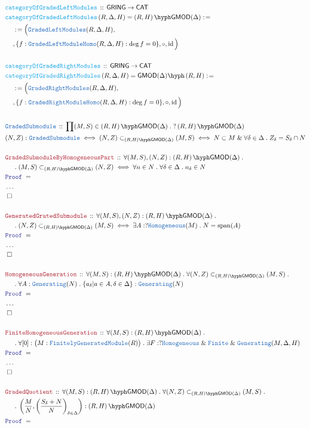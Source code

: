 \documentclass[12pt]{scrartcl}
\newcommand{\TYPE}[1]{\textcolor{NavyBlue}{\mathtt{#1}}}
\newcommand{\FUNC}[1]{\textcolor{Cerulean}{\mathtt{#1}}}
\newcommand{\LOGIC}[1]{\textcolor{Blue}{\mathtt{#1}}}
\newcommand{\THM}[1]{\textcolor{Maroon}{\mathtt{#1}}}
\renewcommand{\.}{\; . \;}
\newcommand{\de}{: \kern 0.1pc =}
\newcommand{\Act}[1]{\left(#1\right)}
\newcommand{\Theorem}[2]{& \THM{#1} \, :: \, #2 \\ & \Proof = \\ }
\newcommand{\DeclareType}[2]{& \TYPE{#1} \, :: \, #2 \\}
\newcommand{\DefineNamedType}[4]{& #1 : \TYPE{#2} \iff #3 \iff #4 \\}
\newcommand{\DeclareFunc}[2]{& \FUNC{#1} \, :: \, #2 \\}
\newcommand{\DefineNamedFunc}[4]{&  \FUNC{#1}\Act{#2} = #3 \de #4 \\}
\newcommand{\NewLine}{\\ & \kern 1pc}
\newcommand{\Page}[1]{ \begin{align*} #1 \end{align*}   }
\newcommand{\NoProof}{ & \ldots \\ \EndProof}
\renewcommand{\And}{\; \& \;}
\DeclareMathOperator*{\id}{id}
\newcommand{\QED}{\; \square}
\newcommand{\EndProof}{& \QED \\}
\newcommand{\Proof}{\LOGIC{Proof} \; }
\newcommand{\CAT}{\mathsf{CAT}}
\newcommand{\gsubmod}[3]{\subset_{\GLMOD{#1}{#2}{#3}}}
\newcommand{\FGM}{\TYPE{FinitelyGeneratedModule}}
\DeclareMathOperator{\Span}{span}
\newcommand{\GLMOD}[3]{\Act{#1,#2}\hyph\mathsf{GMOD}(#3)}
\newcommand{\GRMOD}[3]{\mathsf{GMOD}(#3)\hyph\Act{#1,#2}}
\newcommand{\GRING}{\mathsf{GRING}}
\begin{document}
\Page{
	\DeclareFunc{categoryOfGradedLeftModules}{ \GRING \to \CAT }
	\DefineNamedFunc{categoryOfGradedLeftModules}{R,\Delta,H}
	{ 
		\GLMOD{R}{H}{\Delta}  
	}
	{ 
	    	\NewLine  \de \Big(\TYPE{GradedLeftModules}(R,\Delta,H), 
		\NewLine, \{ f : \TYPE{GradedLeftModuleHomo}(R,\Delta,H) : \deg f = 0\} ,\circ, \id\Big)         
	}
	\\
	\DeclareFunc{categoryOfGradedRightModules}{ \GRING \to \CAT }
	\DefineNamedFunc{categoryOfGradedRightModules}{R,\Delta,H}
	{ 
		\GRMOD{R}{H}{\Delta}  
	}
	{ 
		\NewLine  \de \Big(\TYPE{GradedRightModules}(R,\Delta,H), \NewLine ,
			\{ f : \TYPE{GradedRightModuleHomo}(R,\Delta,H) : \deg f = 0\},\circ, \id\Big)         
	}
	\\
	\DeclareType{GradedSubmodule}{\prod (M,S) \in \GLMOD{R}{H}{\Delta} \. ?\GLMOD{R}{H}{\Delta}}
	\DefineNamedType{(N,Z)}{GradedSubmodule}{ (N,Z) \gsubmod{R}{H}{\Delta} (M,S) }{ N \subset M \And \forall \delta \in \Delta \. Z_\delta = S_\delta \cap N  }
	\\
	\Theorem{GradedSubmoduleByHomogeneousPart}{
		\forall (M,S),(N,Z) : \GLMOD{R}{H}{\Delta} \. \NewLine \.  
		(M,S) \gsubmod{R}{H}{\Delta} (N,Z) \iff 
		\forall n \in N \. \forall \delta \in \Delta \. 
		n_\delta \in N 
	}
	\NoProof
	\\
	\Theorem{GeneratedGratedSubmodule}{  
		\forall (M,S),(N,Z) : \GLMOD{R}{H}{\Delta} \. \NewLine \.           
		(N,Z) \gsubmod{R}{H}{\Delta} (M,S) \iff
		\exists A : ?\TYPE{Homogeneous}(M) \.
		N = \Span(A)
	}
	\NoProof
	\\
	\Theorem{HomogeneousGeneration}{
		\forall (M,S) : \GLMOD{R}{H}{\Delta} \.
		\forall (N,Z) \gsubmod{R}{H}{\Delta} (M,S) \. \NewLine \. 
		\forall A : \TYPE{Generating}(N) \. 
		\{ a_\delta | a \in A, \delta \in \Delta  \} : \TYPE{Generating}(N)
	}
	\NoProof
	\\
	\Theorem{FiniteHomogeneousGeneration}{
		\forall (M,S) : \GLMOD{R}{H}{\Delta} \. \NewLine \. 
		\forall [0] : \big( M : \FGM(R) \big) \.  
		\exists F : ?\TYPE{Homogeneous} \And \TYPE{Finite} \And \TYPE{Generating}(M,\Delta,H)
	}
	\NoProof
	\\
	\Theorem{GradedQuotient}{
		\forall (M,S) : \GLMOD{R}{H}{\Delta} \.  
		\forall (N,Z) \gsubmod{R}{H}{\Delta} (M,S) \. 
		\NewLine \.
		\left( \frac{M}{N}, \left(\frac{S_\delta + N}{N}\right)_{\delta \in \Delta}  \right) 
		: \GLMOD{R}{H}{\Delta}                    
	}
}
\end{document}
